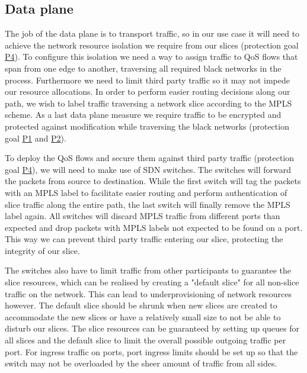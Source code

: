 \subsection{Data plane}
The job of the data plane is to transport traffic, so in our use case it will need to achieve the network resource isolation we require from our slices (protection goal \hyperref[P4]{P4}). To configure this isolation we need a way to assign traffic to QoS flows that span from one edge to another, traversing all required black networks in the process. Furthermore we need to limit third party traffic so it may not impede our resource allocations. In order to perform easier routing decisions along our path, we wish to label traffic traversing a network slice according to the MPLS scheme. As a last data plane measure we require traffic to be encrypted and protected against modification while traversing the black networks (protection goal \hyperref[P1]{P1} and \hyperref[P2]{P2}).

To deploy the QoS flows and secure them against third party traffic (protection goal \hyperref[P4]{P4}), we will need to make use of SDN switches. The switches will forward the packets from source to destination. While the first switch will tag the packets with an MPLS label to facilitate easier routing and perform authentication of slice traffic along the entire path, the last switch will finally remove the MPLS label again. All switches will discard MPLS traffic from different ports than expected and drop packets with MPLS labels not expected to be found on a port. This way we can prevent third party traffic entering our slice, protecting the integrity of our slice.

The switches also have to limit traffic from other participants to guarantee the slice resources, which can be realised by creating a "default slice" for all non-slice traffic on the network. This can lead to underprovisioning of network resources however. The default slice should be shrunk when new slices are created to accommodate the new slices or have a relatively small size to not be able to disturb our slices. The slice resources can be guaranteed by setting up queues for all slices and the default slice to limit the overall possible outgoing traffic per port. For ingress traffic on ports, port ingress limits should be set up so that the switch may not be overloaded by the sheer amount of traffic from all sides.

